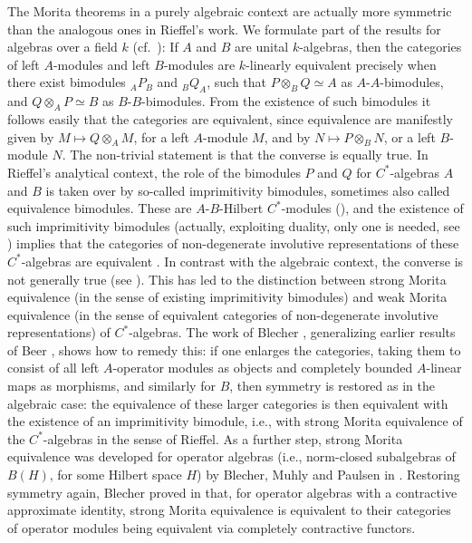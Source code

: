\documentclass{amsart}
\theoremstyle{plain}
\theoremstyle{definition}
\numberwithin{equation}{section}
\begin{document}
The Morita theorems in a purely algebraic context are actually more symmetric than the analogous ones in Rieffel's work. We formulate part of the results for algebras over a field $k$ (cf.\ \cite[Theorem~12.12]{faith}): If $A$ and $B$ are unital $k$-algebras, then the categories of left $A$-modules and left $B$-modules are $k$-linearly equivalent precisely when there exist bimodules ${_A}P_B$ and ${_B}Q_A$, such that $P\otimes_B Q\simeq A$ as $A$-$A$-bimodules, and $Q\otimes_A P\simeq B$ as $B$-$B$-bimodules. From the existence of such bimodules it follows easily that the categories are equivalent, since equivalence are manifestly given by $M\mapsto Q\otimes_A M$, for a left $A$-module $M$, and by $N\mapsto P\otimes_B N$, or a left $B$-module $N$. The non-trivial statement is that the converse is equally true. In Rieffel's analytical context, the role of the bimodules $P$ and $Q$ for $C^*$-algebras $A$ and $B$ is taken over by so-called imprimitivity bimodules, sometimes also called equivalence bimodules. These are $A$-$B$-Hilbert $C^*$-modules (\cite[Definition~3.1]{raeburnwilliams}), and the existence of such imprimitivity bimodules (actually, exploiting duality, only one is needed, see \cite[p.~49]{raeburnwilliams}) implies that the categories of non-degenerate involutive representations of these $C^*$-algebras are equivalent \cite[Theorem~3.29]{raeburnwilliams}. In contrast with the algebraic context, the converse is not generally true (see \cite[Remark~3.15 and Hooptedoodle~3.30]{raeburnwilliams}). This has led to the distinction between strong Morita equivalence (in the sense of existing imprimitivity bimodules) and weak Morita equivalence (in the sense of equivalent categories of non-degenerate involutive representations) of $C^*$-algebras. The work of Blecher \cite{blecher}, generalizing earlier results of Beer \cite{beer}, shows how to remedy this: if one enlarges the categories, taking them to consist of all left $A$-operator modules as objects and completely bounded $A$-linear maps as morphisms, and similarly for $B$, then symmetry is restored as in the algebraic case: the equivalence of these larger categories is then equivalent with the existence of an imprimitivity bimodule, i.e., with strong Morita equivalence of the $C^*$-algebras in the sense of Rieffel. As a further step, strong Morita equivalence was developed for operator algebras (i.e., norm-closed subalgebras of $B(H)$, for some Hilbert space $H$) by Blecher, Muhly and Paulsen in \cite{blechermuhlypaulsen}. Restoring symmetry again, Blecher proved in \cite{blecheroperatoralgebras} that, for operator algebras with a contractive approximate identity, strong Morita equivalence is equivalent to their categories of operator modules being equivalent via completely contractive functors.
\end{document}
